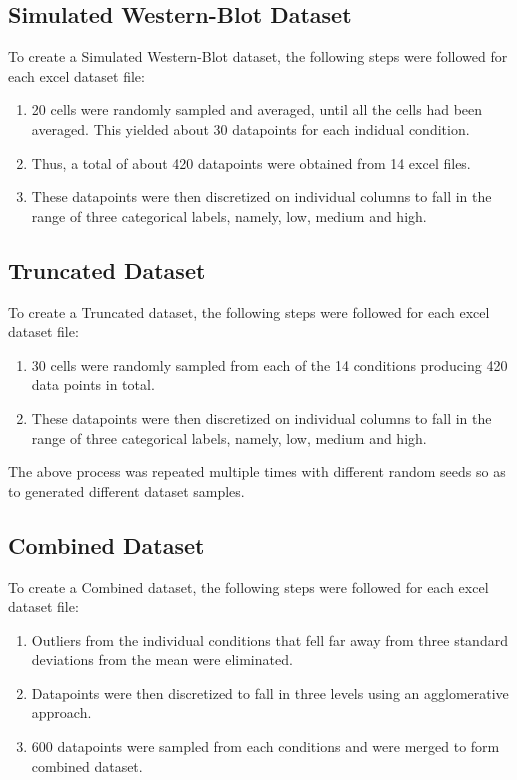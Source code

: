 \documentclass[conference]{IEEEtran}
\begin{document}
\subsection{Simulated Western-Blot Dataset}
To create a Simulated Western-Blot dataset, the following steps were followed for each excel dataset file: 
\begin{enumerate}
  \item 20 cells were randomly sampled and averaged, until all the cells had been averaged. This yielded about 30 datapoints for each indidual condition.
  \item Thus, a total of about 420 datapoints were obtained from 14 excel files.
  \item These datapoints were then discretized on individual columns to fall in the range of three categorical labels, namely, low, medium and high.
\end{enumerate}

\subsection{Truncated Dataset}
To create a Truncated dataset, the following steps were followed for each excel dataset file: 
\begin{enumerate}
  \item 30 cells were randomly sampled from each of the 14 conditions producing 420 data points in total.
  \item These datapoints were then discretized on individual columns to fall in the range of three categorical labels, namely, low, medium and high.
\end{enumerate}
The above process was repeated multiple times with different random seeds so as to generated different dataset samples.

\subsection{Combined Dataset}
To create a Combined dataset, the following steps were followed for each excel dataset file:
\begin{enumerate}
  \item Outliers from the individual conditions that fell far away from three standard deviations from the mean were eliminated.
  \item Datapoints were then discretized to fall in three levels using an agglomerative approach.
  \item 600 datapoints were sampled from each conditions and were merged to form combined dataset.
\end{enumerate}
\end{document}
